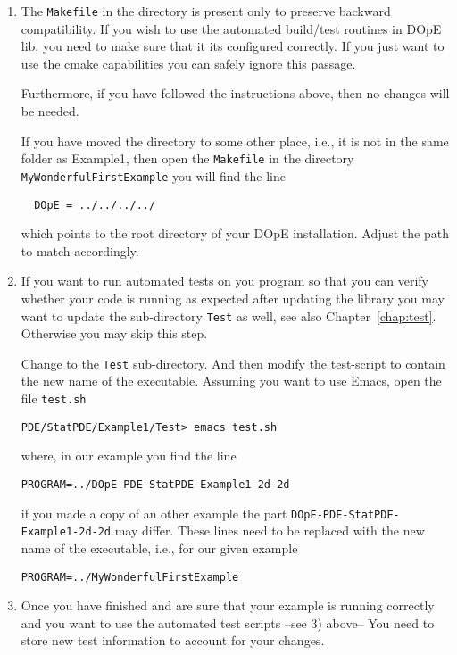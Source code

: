 \begin{enumerate}
\item The \texttt{Makefile} in the directory is present only to
  preserve backward compatibility. If you wish to use the automated
  build/test routines in DOpE lib, you need to make sure that it its
  configured correctly. If you just want to use the cmake capabilities 
  you can safely ignore this passage.

  Furthermore, if you have followed the instructions above, then no
  changes will be needed.

  If you have moved the directory to some other place, i.e., it is not
  in the same folder as Example1, then open the \texttt{Makefile} 
  in the directory \texttt{MyWonderfulFirstExample}
  you will find the line 
  \begin{verbatim}
  DOpE = ../../../../
  \end{verbatim}
  which points to the root directory of your DOpE installation.
  Adjust the path to match accordingly.

\item If you want to run automated tests on you program so that you can 
  verify whether your code is running as expected after updating the 
  library you may want to update the sub-directory \texttt{Test} 
  as well, see also Chapter~\ref{chap:test}. Otherwise you may skip this 
  step.

  Change to the \texttt{Test} sub-directory. And then modify the
  test-script to contain the new name of the executable.
  Assuming you want to use Emacs, open the file \texttt{test.sh}
\begin{verbatim}
PDE/StatPDE/Example1/Test> emacs test.sh
\end{verbatim}
  where, in our example you find the line
\begin{verbatim}
PROGRAM=../DOpE-PDE-StatPDE-Example1-2d-2d
\end{verbatim} 
  if you made a copy of an other example the part \texttt{DOpE-PDE-StatPDE-Example1-2d-2d}
  may differ. These lines need to be replaced with the new name of the 
  executable, i.e., for our given example
\begin{verbatim}
PROGRAM=../MyWonderfulFirstExample
\end{verbatim} 
    
\item Once you have finished and are sure that your example is running correctly
  and you want to use the automated test scripts --see 3) above-- You need 
  to store new test information to account for your changes. 
  

\end{enumerate}
